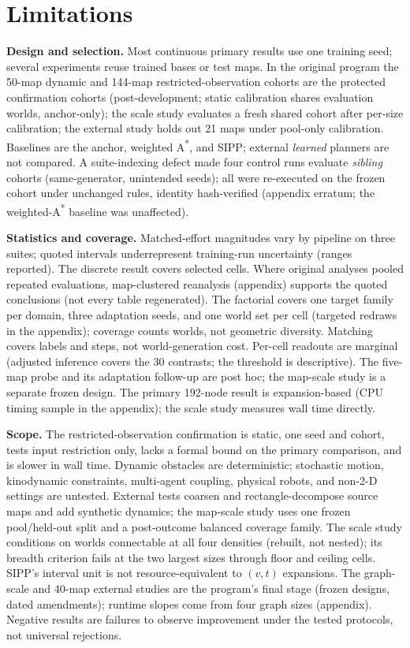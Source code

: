 \documentclass[letterpaper]{article} %
\begin{document}
\section{Limitations}

\textbf{Design and selection.} Most continuous primary results use one training seed; several experiments reuse trained bases or test maps. In the original program the 50-map dynamic and 144-map restricted-observation cohorts are the protected confirmation cohorts (post-development; static calibration shares evaluation worlds, anchor-only); the scale study evaluates a fresh shared cohort after per-size calibration; the external study holds out 21 maps under pool-only calibration. Baselines are the anchor, weighted A\textsuperscript{*}, and SIPP; external \emph{learned} planners are not compared. A suite-indexing defect made four control runs evaluate \emph{sibling} cohorts (same-generator, unintended seeds); all were re-executed on the frozen cohort under unchanged rules, identity hash-verified (appendix erratum; the weighted-A\textsuperscript{*} baseline was unaffected).

\textbf{Statistics and coverage.} Matched-effort magnitudes vary by pipeline on three suites; quoted intervals underrepresent training-run uncertainty (ranges reported). The discrete result covers selected cells. Where original analyses pooled repeated evaluations, map-clustered reanalysis (appendix) supports the quoted conclusions (not every table regenerated). The factorial covers one target family per domain, three adaptation seeds, and one world set per cell (targeted redraws in the appendix); coverage counts worlds, not geometric diversity. Matching covers labels and steps, not world-generation cost. Per-cell readouts are marginal (adjusted inference covers the 30 contrasts; the threshold is descriptive). The five-map probe and its adaptation follow-up are post hoc; the map-scale study is a separate frozen design. The primary 192-node result is expansion-based (CPU timing sample in the appendix); the scale study measures wall time directly.

\textbf{Scope.} The restricted-observation confirmation is static, one seed and cohort, tests input restriction only, lacks a formal bound on the primary comparison, and is slower in wall time. Dynamic obstacles are deterministic; stochastic motion, kinodynamic constraints, multi-agent coupling, physical robots, and non-2-D settings are untested. External tests coarsen and rectangle-decompose source maps and add synthetic dynamics; the map-scale study uses one frozen pool/held-out split and a post-outcome balanced coverage family. The scale study conditions on worlds connectable at all four densities (rebuilt, not nested); its breadth criterion fails at the two largest sizes through floor and ceiling cells. SIPP's interval unit is not resource-equivalent to $(v,t)$ expansions. The graph-scale and 40-map external studies are the program's final stage (frozen designs, dated amendments); runtime slopes come from four graph sizes (appendix). Negative results are failures to observe improvement under the tested protocols, not universal rejections.
\end{document}
